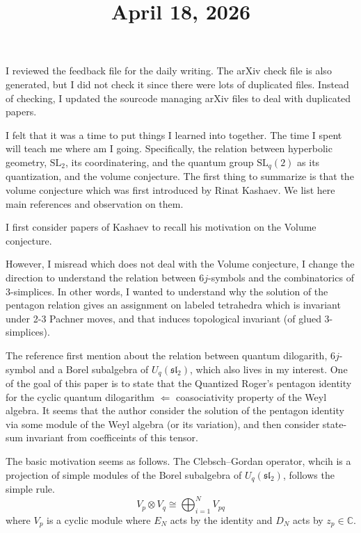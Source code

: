 \documentclass[11pt]{amsart}
\title{April 18, 2026}
\begin{document}
\maketitle

I reviewed the feedback file for the daily writing.
The arXiv check file is also generated, but I did not check it since there were lots of duplicated files.
Instead of checking, I updated the sourcode managing arXiv files to deal with duplicated papers.

\par\vspace{1em}

I felt that it was a time to put things I learned into together.
The time I spent will teach me where am I going.
Specifically, the relation between hyperbolic geometry, $\mathrm{SL}_2$, its coordinatering, and the quantum group $\mathrm{SL}_q(2)$ as its quantization, and the volume conjecture.
The first thing to summarize is that the volume conjecture which was first introduced by Rinat Kashaev.
We list here main references and observation on them.

\par\space{1em}
I first consider papers of Kashaev to recall his motivation on the Volume conjecture.

However, I misread \cite{Kashaev-1994-Qdilog6j} which does not deal with the Volume conjecture, I change the direction to understand the relation between $6j$-symbols and the combinatorics of 3-simplices.
In other words, I wanted to understand why the solution of the pentagon relation gives an assignment on labeled tetrahedra which is invariant under 2-3 Pachner moves, and that induces topological invariant (of glued 3-simplices).

The reference first mention about the relation between quantum dilogarith, $6j$-symbol and a Borel subalgebra of $U_q(\mathfrak{sl}_2)$, which also lives in my interest.
One of the goal of this paper is to state that the Quantized Roger's pentagon identity for the cyclic quantum dilogarithm $\Leftarrow$ coasociativity property of the Weyl algebra.
It seems that the author consider the solution of the pentagon identity via some module of the Weyl algebra (or its variation), and then consider state-sum invariant from coefficeints of this tensor.

\par\space{1em}

The basic motivation seems as follows.
The Clebsch--Gordan operator, whcih is a projection of simple modules of the Borel subalgebra of $U_q(\mathfrak{sl}_2)$, follows the simple rule.
\[
    V_p \otimes V_q \cong \bigoplus_{i=1}^N  V_{pq}
\]
where $V_p$ is a cyclic module where $E_N$ acts by the identity and $D_N$ acts by $z_p \in \mathbb{C}$.
\end{document}
